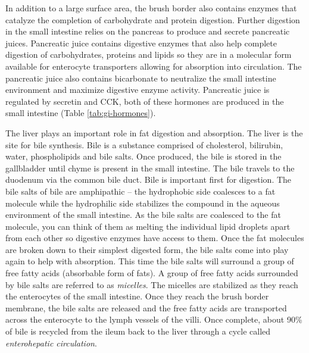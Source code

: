 \documentclass{tufte-handout}
\begin{document}
In addition to a large surface area, the brush border also contains enzymes that catalyze the completion of carbohydrate and protein digestion. Further digestion in the small intestine relies on the pancreas to produce and secrete pancreatic juices. Pancreatic juice contains digestive enzymes that also help complete digestion of carbohydrates, proteins and lipids so they are in a molecular form available for enterocyte transporters allowing for absorption into circulation. The pancreatic juice also contains bicarbonate to neutralize the small intestine environment and maximize digestive enzyme activity. Pancreatic juice is regulated by secretin and CCK, both of these hormones are produced in the small intestine (Table \ref{tab:gi-hormones}). 

The liver plays an important role in fat digestion and absorption. The liver is the site for bile synthesis. Bile is a substance comprised of  cholesterol, bilirubin, water, phospholipids and bile salts. Once produced, the bile is stored in the gallbladder until chyme is present in the small intestine. The bile travels to the duodenum via the common bile duct. Bile is important first for digestion. The bile salts of bile are amphipathic – the hydrophobic side coalesces to a fat molecule while the hydrophilic side stabilizes the compound in the aqueous environment of the small intestine. As the bile salts are coalesced to the fat molecule, you can think of them as melting the individual lipid droplets apart from each other so digestive enzymes have access to them. Once the fat molecules are broken down to their simplest digested form, the bile salts come into play again to help with absorption. This time the bile salts will surround a group of free fatty acids (absorbable form of fats). A group of free fatty acids surrounded by bile salts are referred to as \emph{micelles}. The micelles are stabilized as they reach the enterocytes of the small intestine. Once they reach the brush border membrane, the bile salts are released and the free fatty acids are transported across the enterocyte to the lymph vessels of the villi. Once complete, about 90\% of bile is recycled from the ileum back to the liver through a cycle called \emph{enterohepatic circulation}.
\end{document}
